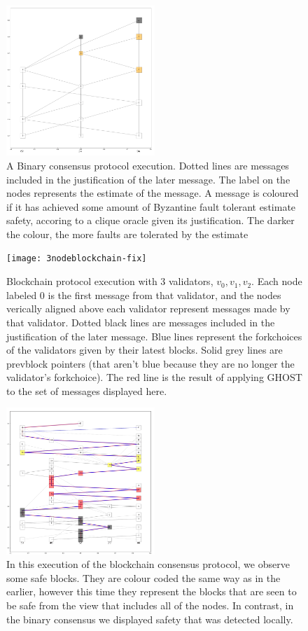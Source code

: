 \documentclass{article}
\theoremstyle{definition}
\begin{document}
\begin{figure}[h!]
\centering
\includegraphics[width=0.5\textwidth]{3binary}
\caption{A Binary consensus protocol execution. Dotted lines are messages included in the justification of the later message. The label on the nodes represents the estimate of the message. A message is coloured if it has achieved some amount of Byzantine fault tolerant estimate safety, accoring to a clique oracle given its justification. The darker the colour, the more faults are tolerated by the estimate}
\end{figure}


\begin{figure}[h!]
\centering
\texttt{[image: 3nodeblockchain-fix]}
\caption{Blockchain protocol execution with 3 validators, $v_0, v_1, v_2$. Each node labeled $0$ is the first message from that validator, and the nodes verically aligned above each validator represent messages made by that validator. Dotted black lines are messages included in the justification of the later message. Blue lines represent the forkchoices of the validators given by their latest blocks. Solid grey lines are prevblock pointers (that aren't blue because they are no longer the validator's forkchoice). The red line is the result of applying GHOST to the set of messages displayed here.}
\end{figure}


\begin{figure}[h!]
\centering
\includegraphics[width=0.5\textwidth]{blockchainsafety}
\caption{In this execution of the blockchain consensus protocol, we observe some safe blocks. They are colour coded the same way as in the earlier, however this time they represent the blocks that are seen to be safe from the view that includes all of the nodes. In contrast, in the binary consensus we displayed safety that was detected locally.}
\end{figure}
\end{document}
